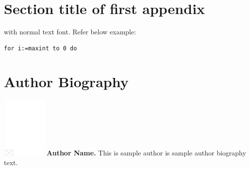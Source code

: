 \documentclass[AMA,STIX1COL]{WileyNJD-v2}
\begin{document}
\appendix

\section{Section title of first appendix\label{app1}}

with normal text font. Refer below example:

\begin{lstlisting}[caption={Descriptive Caption Text},label=DescriptiveLabel]
for i:=maxint to 0 do
\end{lstlisting}

%

\clearpage

\section*{Author Biography}

\begin{biography}{\includegraphics[width=66pt,height=86pt,draft]{empty}}{\textbf{Author Name.} This is sample author is sample author biography text.}
\end{biography}
\end{document}
